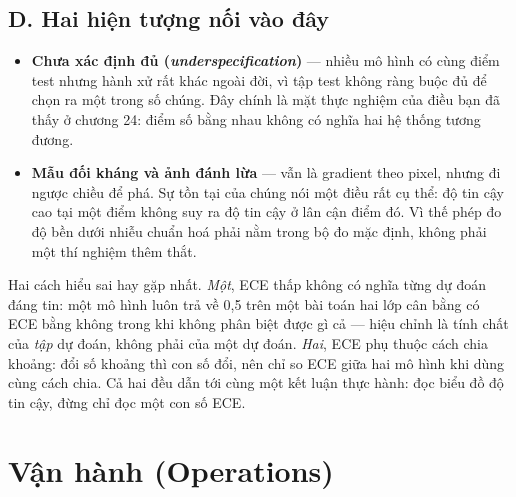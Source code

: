 \documentclass[../../deep_learning.tex]{subfiles}
\begin{document}
\subsection{D. Hai hiện tượng nối vào đây}
\begin{itemize}
\item \textbf{Chưa xác định đủ (\emph{underspecification})} --- nhiều mô hình có cùng điểm test nhưng hành xử rất khác ngoài đời, vì tập test không ràng buộc đủ để chọn ra một trong số chúng. Đây chính là mặt thực nghiệm của điều bạn đã thấy ở chương 24: điểm số bằng nhau không có nghĩa hai hệ thống tương đương.
\item \textbf{Mẫu đối kháng và ảnh đánh lừa} --- vẫn là gradient theo pixel, nhưng đi ngược chiều để phá. Sự tồn tại của chúng nói một điều rất cụ thể: độ tin cậy cao tại một điểm không suy ra độ tin cậy ở lân cận điểm đó. Vì thế phép đo độ bền dưới nhiễu chuẩn hoá \cite{hendrycks2019benchmarking} phải nằm trong bộ đo mặc định, không phải một thí nghiệm thêm thắt.
\end{itemize}

\begin{cambay}
Hai cách hiểu sai hay gặp nhất. \emph{Một}, ECE thấp không có nghĩa từng dự đoán đáng tin: một mô hình luôn trả về 0,5 trên một bài toán hai lớp cân bằng có ECE bằng không trong khi không phân biệt được gì cả --- hiệu chỉnh là tính chất của \emph{tập} dự đoán, không phải của một dự đoán. \emph{Hai}, ECE phụ thuộc cách chia khoảng: đổi số khoảng thì con số đổi, nên chỉ so ECE giữa hai mô hình khi dùng cùng cách chia. Cả hai đều dẫn tới cùng một kết luận thực hành: đọc biểu đồ độ tin cậy, đừng chỉ đọc một con số ECE.
\end{cambay}

\section{Vận hành (Operations)}
\end{document}
